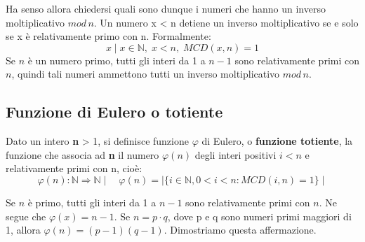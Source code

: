 Ha senso allora chiedersi quali sono dunque i numeri che hanno un inverso moltiplicativo $mod \, n$. Un numero x < n detiene un inverso moltiplicativo se e solo se x è relativamente primo con n. Formalmente:
\begin{equation}
x \mid x \in \mathbb{N},\; x < n,\; MCD(x,n) = 1
\end{equation}
Se $n$ è un numero primo, tutti gli interi da 1 a $n-1$ sono relativamente primi con $n$, quindi tali numeri ammettono tutti un inverso moltiplicativo $mod \, n$.

\subsection{Funzione di Eulero o totiente}  

Dato un intero \textbf{n} > 1, si definisce funzione $\varphi$ di Eulero, o \textbf{funzione totiente}, la funzione che associa ad \textbf{n} il numero $\varphi (n)$ degli interi positivi $i < n$ e relativamente
primi con n, cioè:
\begin{equation}
\varphi (n): \mathbb{N} \Rightarrow \mathbb{N} \mid \quad \varphi (n) = \mid \{ i \in \mathbb{N}, 0 < i < n: MCD(i,n) = 1 \} \mid
\end{equation}

Se $n$ è primo, tutti gli interi da 1 a $n-1$ sono relativamente primi con $n$. Ne segue che $\varphi(x) = n - 1$. Se $n = p \cdot q$, dove p e q sono numeri primi maggiori di 1, allora $\varphi(n) = (p-1)(q-1)$. Dimostriamo questa affermazione.

